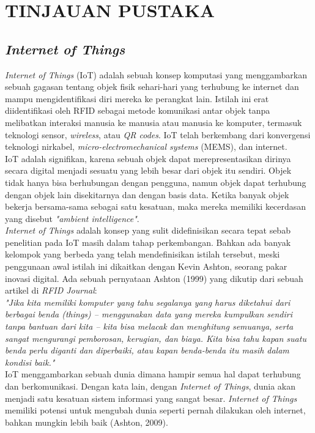 \chapter{TINJAUAN PUSTAKA}
\section{\textit{Internet of Things}}
\tab \textit{Internet of Things} (IoT) adalah sebuah konsep komputasi yang menggambarkan sebuah gagasan tentang objek fisik sehari-hari yang terhubung ke internet dan mampu mengidentifikasi diri mereka ke perangkat lain. Istilah ini erat diidentifikasi oleh RFID sebagai metode komunikasi antar objek tanpa melibatkan interaksi manusia ke manusia atau manusia ke komputer, termasuk teknologi sensor, \textit{wireless}, atau \textit{QR codes}. IoT telah berkembang dari konvergensi teknologi nirkabel, \textit{micro-electromechanical systems} (MEMS), dan internet.\\
\tab IoT adalah signifikan, karena sebuah objek dapat merepresentasikan dirinya secara digital menjadi sesuatu yang lebih besar dari objek itu sendiri. Objek tidak hanya bisa berhubungan dengan pengguna, namun objek dapat terhubung dengan objek lain disekitarnya dan dengan basis data. Ketika banyak objek bekerja bersama-sama sebagai satu kesatuan, maka mereka memiliki kecerdasan yang disebut \textit{"ambient intelligence"}.\\
\tab \textit{Internet of Things} adalah konsep yang sulit didefinisikan secara tepat sebab penelitian pada IoT masih dalam tahap perkembangan. Bahkan ada banyak kelompok yang berbeda yang telah mendefinisikan istilah tersebut, meski penggunaan awal istilah ini dikaitkan dengan Kevin Ashton, seorang pakar inovasi digital. Ada sebuah pernyataan Ashton (1999) yang dikutip dari sebuah artikel di \textit{RFID Journal}:\\
\tab \textit{"Jika kita memiliki komputer yang tahu segalanya yang harus diketahui dari berbagai benda \textit{(things)} – menggunakan data yang mereka kumpulkan sendiri tanpa bantuan dari kita – kita bisa melacak dan menghitung semuanya, serta sangat mengurangi pemborosan, kerugian, dan biaya. Kita bisa tahu kapan suatu benda perlu diganti dan diperbaiki, atau kapan benda-benda itu masih dalam kondisi baik."}\\
\tab IoT menggambarkan sebuah dunia dimana hampir semua hal dapat terhubung dan berkomunikasi. Dengan kata lain, dengan \textit{Internet of Things}, dunia akan menjadi satu kesatuan sistem informasi yang sangat besar. \textit{Internet of Things} memiliki potensi untuk mengubah dunia seperti pernah dilakukan oleh internet, bahkan mungkin lebih baik (Ashton, 2009).


